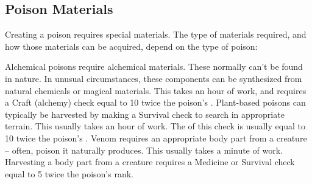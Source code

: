   \subsection{Poison Materials}\label{Poison Materials}
    Creating a poison requires special materials.
    The type of materials required, and how those materials can be acquired, depend on the type of poison:

    \begin{itemize}
       Alchemical poisons require alchemical materials.
        These normally can't be found in nature.
        In unusual circumstances, these components can be synthesized from natural chemicals or magical materials.
        This takes an hour of work, and requires a Craft (alchemy) check equal to 10 \add twice the poison's .
       Plant-based poisons can typically be harvested by making a Survival check to search in appropriate terrain.
        This usually takes an hour of work.
        The  of this check is usually equal to 10 \add twice the poison's .
       Venom requires an appropriate body part from a creature -- often, poison it naturally produces.
        This usually takes a minute of work.
        Harvesting a body part from a creature requires a Medicine or Survival check equal to 5 \add twice the poison's rank.
    \end{itemize}
